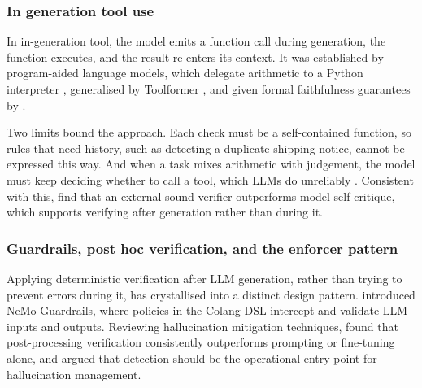 \subsubsection{In generation tool use}

In in-generation tool, the model emits a function call during generation, the function executes, and the result re-enters its context. It was established by program-aided language models, which delegate arithmetic to a Python interpreter \citep{gao2022pal,chen2022pal}, generalised by Toolformer \citep{schick2024}, and given formal faithfulness guarantees by \citet{lyu2023}.

Two limits bound the approach. Each check must be a self-contained function, so rules that need history, such as detecting a duplicate shipping notice, cannot be expressed this way. And when a task mixes arithmetic with judgement, the model must keep deciding whether to call a tool, which LLMs do unreliably \citep{trevino2025,yang2024tools}. Consistent with this, \citet{stechly2024} find that an external sound verifier outperforms model self-critique, which supports verifying after generation rather than during it.

\subsubsection{Guardrails, post hoc verification, and the enforcer pattern}

Applying deterministic verification after LLM generation, rather than trying to prevent errors during it, has crystallised into a distinct design pattern. \citet{rebedea2023} introduced NeMo Guardrails, where policies in the Colang DSL intercept and validate LLM inputs and outputs. Reviewing hallucination mitigation techniques, \citet{joshi2025} found that post-processing verification consistently outperforms prompting or fine-tuning alone, and \citet{pesaranghader2026} argued that detection should be the operational entry point for hallucination management.

